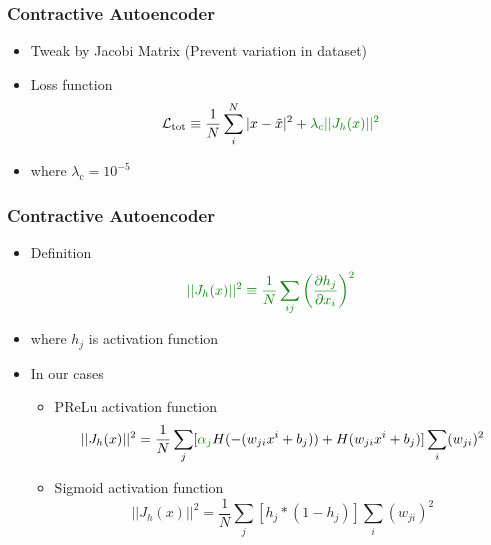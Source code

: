 \documentclass{beamer}
\begin{document}
\begin{frame}
\frametitle{Contractive Autoencoder}

\begin{itemize}
    \item Tweak by \textcolor[RGB]{0,128,0}{Jacobi Matrix (Prevent variation in dataset)}
    \item Loss function
    \begin{equation}
        \mathcal{L}_{\text{tot}} \equiv \frac{1}{N}\sum_i^N |x-\tilde{x}|^2 + \textcolor[RGB]{0,128,0}{\lambda_{\text{c}}||J_h(x)||^2}
    \end{equation}
    \item where $\lambda_{\text{c}} = 10^{-5}$
\end{itemize}
\end{frame}
\begin{frame}
\frametitle{Contractive Autoencoder}
\begin{itemize}
    \item Definition
    \begin{equation}
        \textcolor[RGB]{0,128,0}{||J_h(x)||^2 \equiv \frac{1}{N}\sum_{ij}\left(\frac{\partial h_j}{\partial x_i}\right)^2}
    \end{equation}
    \item where $h_j$ is activation function
    \item In our cases
    \begin{itemize}
        \item PReLu activation function
        \begin{equation}
            ||J_h(x)||^2 = \frac{1}{N}\sum_j[\textcolor[RGB]{0,128,0}{\alpha_j}H(-(w_{ji}x^i+b_j)) + H(w_{ji}x^i+b_j)]\sum_i(w_{ji})^2
        \end{equation}
        \item Sigmoid activation function
        \begin{equation}
            ||J_h(x)||^2 = \frac{1}{N}\sum_j[h_j*(1-h_j)]\sum_i(w_{ji})^2
        \end{equation}
    \end{itemize}
\end{itemize}

\end{frame}
\end{document}
